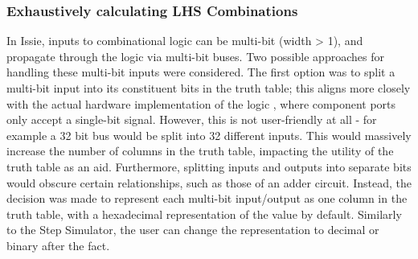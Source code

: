\newcommand{\ttCellIO}{
    Discriminated Union type representing which input or output of the logic the data belongs to. \codestyle{CellIO}s can either be the existing \codestyle{SimulationIO} type used to describe Inputs and Outputs, or Viewers.
}

\newcommand{\ttCell}{
    Record type which represents the contents of a cell in a truth table. Is made up of a \codestyle{CellIO} and some \codestyle{CellData}.
}

\newcommand{\ttRow}{
    Represents a row in a truth table, which is a list of Truth Table Cells.
}

\newcommand{\truthtable}{
    Record type containing various \codestyle{Map} data structures which map a row of inputs to a row of outputs. Different map data structures are used for caching different versions of the truth table. The record also contains fields and methods which contain or relay other metadata about the truth table.
}

\subsubsection{Exhaustively calculating LHS Combinations}
In Issie, inputs to combinational logic can be multi-bit (width > 1), and propagate through the logic via multi-bit buses. Two possible approaches for handling these multi-bit inputs were considered. The first option was to split a multi-bit input into its constituent bits in the truth table; this aligns more closely with the actual hardware implementation of the logic \cite{muxtables}, where component ports only accept a single-bit signal. However, this is not user-friendly at all - for example a 32 bit bus would be split into 32 different inputs. This would massively increase the number of columns in the truth table, impacting the utility of the truth table as an aid. Furthermore, splitting inputs and outputs into separate bits would obscure certain relationships, such as those of an adder circuit. Instead, the decision was made to represent each multi-bit input/output as one column in the truth table, with a hexadecimal representation of the value by default. Similarly to the Step Simulator, the user can change the representation to decimal or binary after the fact. 

